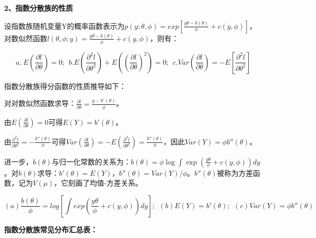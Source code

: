 \documentclass[
]{book}
\begin{document}
\textbf{2、指数分散族的性质}

设指数族随机变量Y的概率函数表示为\(p(y;\theta,\phi)=exp[\frac{y\theta-b(\theta)}{\phi}+c(y,\phi)]\)，对数似然函数\(l(\theta,\phi;y)= \frac{y\theta-b(\theta)}{\phi}+c(y,\phi)\)，则有：

\[
a.\ E(\frac{\partial l}{\partial\theta})=0;\ \ b.E(\frac{\partial^2l}{\partial\theta^2})+E((\frac{\partial l }{\partial\theta})^2)=0;\ \ c.Var(\frac{\partial l }{\partial\theta})=-E[\frac{\partial^2 l }{\partial\theta^2}]
\]

指数分散族得分函数的性质推导如下：

对对数似然函数求导：\(\frac{\partial l}{\partial \theta} = \frac{y - b'(\theta)}{\phi}\)。

由\(E(\frac{\partial l}{\partial \theta}) = 0\)可得\(E(Y) = b'(\theta)\)。

由\(\frac{\partial^2 l}{\partial \theta^2} = -\frac{b''(\theta)}{\phi}\)可得\(Var(\frac{\partial l}{\partial \theta}) = -E(\frac{\partial^2 l}{\partial \theta^2}) = \frac{b''(\theta)}{\phi}\)，因此\(Var(Y) = \phi b''(\theta)\)。

进一步，\(b(\theta)\)与归一化常数的关系为：\(b(\theta) = \phi \log \int \exp\left(\frac{y\theta}{\phi} + c(y,\phi)\right) dy\)。对\(b(\theta)\)求导：\(b'(\theta) = E(Y)\)，\(b''(\theta) = Var(Y)/\phi\)。\(b''(\theta)\)被称为方差函数，记为\(V(\mu)\)，它刻画了均值-方差关系。

\[
(a)\frac{b(\theta)}{\phi}=log[\int exp(\frac{y\theta}{\phi}+c(y,\phi))dy];\ \ (b)E(Y)=b'(\theta);\ \ (c)Var(Y)=\phi b''(\theta)
\]

\textbf{指数分散族常见分布汇总表：}
\end{document}
